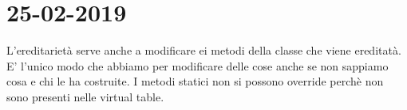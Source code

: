 

\newpage
\section{25-02-2019}
\par


L'ereditarietà serve anche a modificare ei metodi della classe che viene ereditatà. E' l'unico modo che abbiamo per modificare delle cose anche se non sappiamo cosa e chi le ha costruite. \newline
I metodi statici non si possono override perchè non sono presenti nelle virtual table.






